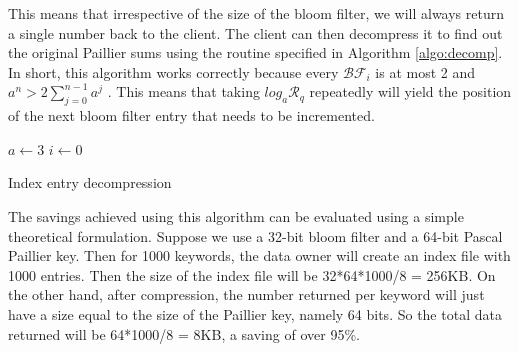 This means that irrespective of the size
of the bloom filter,
we will always return a single number back to the client. The client can then
decompress it to find out the original Paillier sums using the routine
specified in Algorithm \ref{algo:decomp}. In short, this algorithm works correctly because every
$\mathcal{BF}_i$ is at most 2 and $ {a}^{n} > 2\sum_{j=0}^{n-1} {a}^{j}$ . This means
that taking $log_{a} \mathcal{R}_q$ repeatedly will yield the position of the next
bloom filter entry that needs to be incremented.

\begin{algorithm}
$ a \gets 3 $ \;
$i \gets 0 $\;
\;
 \caption{Index entry decompression}
  \vspace{-3px}

 \label{algo:decomp}
\end{algorithm}


The savings achieved using this algorithm can be evaluated using a simple theoretical
formulation. Suppose we use a 32-bit bloom filter and a 64-bit Pascal Paillier key.
Then for 1000 keywords, the data owner will create an index file with 1000 entries.
Then the size of the index file will be 32*64*1000/8 = 256KB. On the other hand,
after compression, the number returned per keyword will just have a size equal to the
size of the Paillier key, namely 64 bits. So the total data returned will be 
64*1000/8 = 8KB, a saving of over 95\%.
